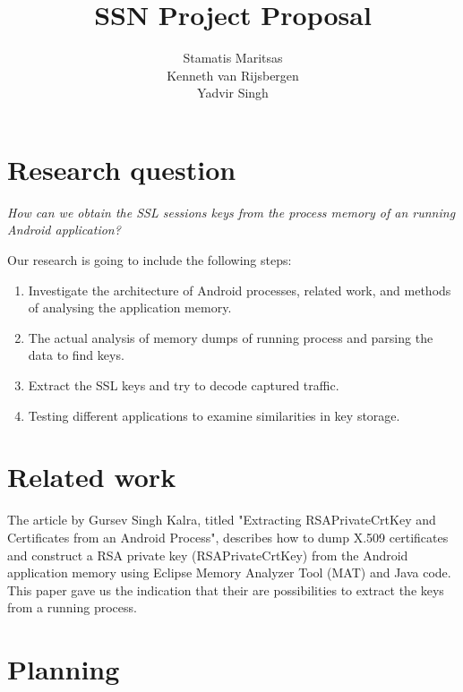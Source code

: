 \documentclass[11pt]{article}
\title{\textbf{SSN Project Proposal}}
\author{Stamatis Maritsas\\
		Kenneth van Rijsbergen\\
		Yadvir Singh}
\date{}
\begin{document}
\maketitle




\section{Research question}

\begin{framed}
\noindent \textit{How can we obtain the SSL sessions keys from the process memory of an running Android application?}
\end{framed}
Our research is going to include the following steps:

\begin{enumerate}
\item{Investigate the architecture of Android processes, related work, and methods of analysing the application memory.}
\item{The actual analysis of memory dumps of running process and parsing the data to find keys.}
\item{Extract the SSL keys and try to decode captured traffic.}
\item{Testing different applications to examine similarities in key storage.}
\end{enumerate}

\clearpage

\section{Related work}
The article by Gursev Singh Kalra, titled "Extracting RSAPrivateCrtKey and Certificates from an Android Process", describes how to dump X.509 certificates and construct a RSA private key (RSAPrivateCrtKey) from the Android application memory using Eclipse Memory Analyzer Tool (MAT) and Java code. This paper gave us the indication that their are possibilities to extract the keys from a running process. \cite{cite1}

\section{Planning}
\end{document}
